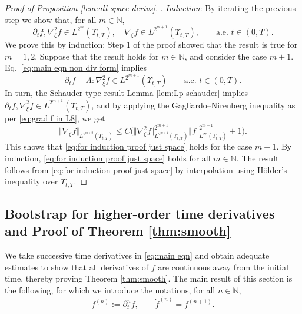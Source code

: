 \documentclass[11pt,a4paper,reqno]{amsart}
\theoremstyle{remark}
\theoremstyle{definition}
\numberwithin{equation}{section}
\newcommand{\bxi}{\xi}
\begin{document}
\begin{proof}[Proof of Proposition \ref{lem:all space derivs}]
. \textit{Induction}: By iterating the previous step we show that, for all $m\in\mathbb{N}$, 
\begin{equation}\label{eq:for induction proof just space}
    \partial_t f, \nabla^2_{\bxi} f \in L^{2^m}(\Upsilon_{t,T}), \quad   \nabla_{\bxi} f \in L^{2^{m+1}}(\Upsilon_{t,T}) , \qquad \text{a.e.~}t\in(0,T). 
\end{equation}
We prove this by induction; Step 1 of the proof showed that the result is true for $m=1,2$. Suppose that the result holds for $m\in\mathbb{N}$, and consider the case $m+1$. Eq.~\eqref{eq:main eqn non div form} implies 
\begin{equation*}
    \partial_t f - A:\nabla^2_{\bxi} f \in L^{2^{m+1}}(\Upsilon_{t,T}) \qquad \text{a.e.~}t\in(0,T). 
\end{equation*}
In turn, the Schauder-type result Lemma \ref{lem:Lp schauder} implies $\partial_t f , \nabla^2_{\bxi} f \in L^{2^{m+1}}(\Upsilon_{t,T})$, and by applying the Gagliardo--Nirenberg inequality as per \eqref{eq:grad f in L8}, we get 
\begin{equation*}
    \Vert \nabla_{\bxi} f \Vert_{L^{2^{m+2}}(\Upsilon_{t,T})} \leq C \Big( \Vert \nabla_{\bxi}^2 f \Vert_{L^{2^{m+1}}(\Upsilon_{t,T})}^{2^{m+1}} \Vert f \Vert_{L^\infty(\Upsilon_{t,T})}^{2^{m+1}} + 1 \Big). 
\end{equation*}
This shows that \eqref{eq:for induction proof just space} holds for the case $m+1$. By induction, \eqref{eq:for induction proof just space} holds for all $m\in\mathbb{N}$. The result follows from \eqref{eq:for induction proof just space} by interpolation using H\"older's inequality over $\Upsilon_{t,T}$. 
\end{proof}


\subsection{Bootstrap for higher-order time derivatives and Proof of Theorem \ref{thm:smooth}}



We take successive time derivatives in \eqref{eq:main eqn} and obtain adequate estimates to show that all derivatives of $f$ are continuous away from the initial time, thereby proving Theorem \ref{thm:smooth}. The main result of this section is the following, for which we introduce the notations, for all $n\in\mathbb{N}$, 
\begin{equation*}
    f^{(n)} := \partial_t^n f, \qquad \dot{f}^{(n)} = f^{(n+1)}. 
\end{equation*}
\end{document}

